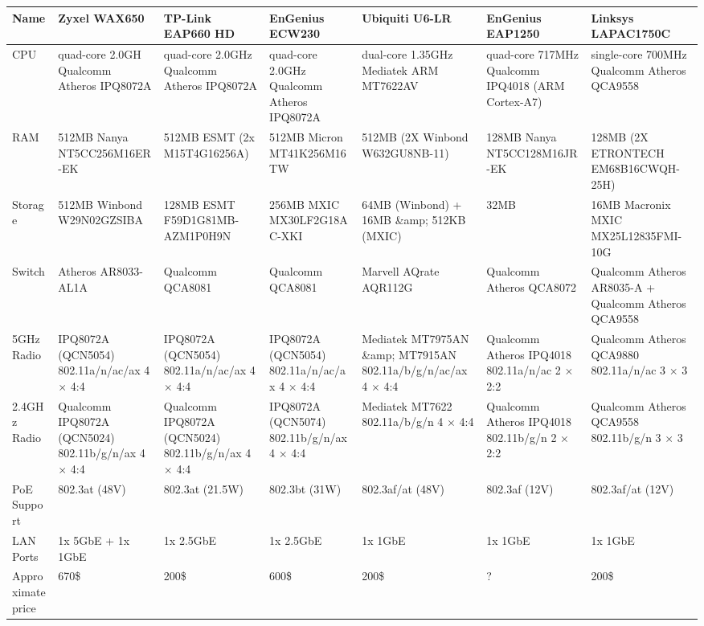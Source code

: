 \documentclass[a4paper,12pt]{report}
\begin{document}
\begin{table}[!ht]
    \centering
    \begin{tabular}{|l|l|l|l|l|l|l|}
        \hline
        Name &
        Zyxel WAX650 &
        TP-Link EAP660 HD &
        EnGenius ECW230 &
        Ubiquiti U6-LR &
        EnGenius EAP1250 &
        Linksys LAPAC1750C \\
        \hline
        CPU &
        quad-core 2.0GH Qualcomm Atheros IPQ8072A &
        quad-core 2.0GHz Qualcomm Atheros IPQ8072A &
        quad-core 2.0GHz Qualcomm Atheros IPQ8072A &
        dual-core 1.35GHz Mediatek ARM MT7622AV  &
        quad-core 717MHz Qualcomm IPQ4018 (ARM Cortex-A7) &
        single-core 700MHz Qualcomm Atheros QCA9558 \\
        \hline
        RAM &
        512MB Nanya NT5CC256M16ER-EK &
        512MB ESMT (2x M15T4G16256A) &
        512MB Micron MT41K256M16TW &
        512MB (2X Winbond W632GU8NB-11) &
        128MB Nanya NT5CC128M16JR-EK &
        128MB (2X ETRONTECH EM68B16CWQH-25H) \\
        \hline
        Storage &
        512MB Winbond W29N02GZSIBA &
        128MB ESMT F59D1G81MB-AZM1P0H9N &
        256MB MXIC MX30LF2G18AC-XKI &
        64MB (Winbond) + 16MB \&amp; 512KB (MXIC) &
        32MB &
        16MB Macronix MXIC MX25L12835FMI-10G \\
        \hline
        Switch &
        Atheros AR8033-AL1A &
        Qualcomm QCA8081 &
        Qualcomm QCA8081 &
        Marvell AQrate AQR112G &
        Qualcomm Atheros QCA8072 & 
        Qualcomm Atheros AR8035-A + Qualcomm Atheros QCA9558 \\
        \hline
        5GHz Radio & 
        IPQ8072A (QCN5054) 802.11a/n/ac/ax 4 $ \times $ 4:4 &
        IPQ8072A (QCN5054) 802.11a/n/ac/ax 4 $ \times $ 4:4 &
        IPQ8072A (QCN5054) 802.11a/n/ac/ax 4 $ \times $ 4:4 &
        Mediatek MT7975AN \&amp; MT7915AN 802.11a/b/g/n/ac/ax 4 $ \times $ 4:4 &
        Qualcomm Atheros IPQ4018 802.11a/n/ac 2 $ \times $ 2:2 &
        Qualcomm Atheros QCA9880 802.11a/n/ac 3 $ \times $ 3 \\
        \hline
        2.4GHz Radio &
        Qualcomm IPQ8072A (QCN5024) 802.11b/g/n/ax 4 $ \times $ 4:4 &
        Qualcomm IPQ8072A (QCN5024) 802.11b/g/n/ax 4 $ \times $ 4:4 &
        IPQ8072A (QCN5074) 802.11b/g/n/ax 4 $ \times $ 4:4 &
        Mediatek MT7622 802.11a/b/g/n 4 $ \times $ 4:4 &
        Qualcomm Atheros IPQ4018 802.11b/g/n 2 $ \times $ 2:2 &
        Qualcomm Atheros QCA9558 802.11b/g/n 3 $ \times $ 3 \\
        \hline
        PoE Support &
        802.3at (48V) &
        802.3at (21.5W) &
        802.3bt (31W) &
        802.3af/at (48V) &
        802.3af (12V) &
        802.3af/at (12V) \\
        \hline
        LAN Ports &
        1x 5GbE + 1x 1GbE &
        1x 2.5GbE &
        1x 2.5GbE &
        1x 1GbE &
        1x 1GbE &
        1x 1GbE \\
        \hline
        Approximate price &
        670\$ &
        200\$ &
        600\$ &
        200\$ &
        {?} &
        200\$ \\
        \hline
    \end{tabular}
\end{table}
\end{document}
